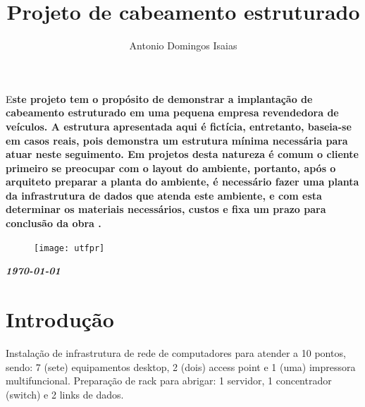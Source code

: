 \documentclass[	DIV=calc,%
							paper=a4,%
							fontsize=12pt,%
							onecolumn]{scrartcl}	 					%
\title{Projeto de cabeamento estruturado}					%
\author{Antonio Domingos Isaias }  	%
\date{}																				%
\newcommand{\initial}[1]{%
     \lettrine[lines=3,lhang=0.3,nindent=0em]{
     				\color{DarkGoldenrod}
     				{\textsf{#1}}}{}}
\begin{document}
\maketitle
\thispagestyle{fancy} 	
\thispagestyle{empty}		%




\initial{E}\textbf{ste projeto tem o propósito de demonstrar a implantação de cabeamento estruturado em uma pequena empresa revendedora de veículos. A estrutura apresentada aqui é fictícia, entretanto, baseia-se em casos reais, pois demonstra um estrutura mínima necessária para atuar neste seguimento.
	Em projetos desta natureza é comum o cliente primeiro se preocupar com o layout do ambiente, portanto, após o arquiteto preparar a planta do ambiente, é necessário fazer uma planta da infrastrutura de dados que atenda este ambiente, e com esta determinar os materiais necessários, custos e fixa um prazo para conclusão da obra  
	.}

\begin{figure}
	\centering
	\texttt{[image: utfpr]}
\end{figure}

\vspace{3cm}
\centerline{\textit{\textbf{\today}}}

\clearpage
    \renewcommand*\listfigurename{Lista de figuras}
\listoffigures

\renewcommand*\listtablename{Lista de tabelas}
\listoftables




\clearpage
\renewcommand{\contentsname}{Sumário}
\tableofcontents
\clearpage

\section{Introdução}
Instalação de infrastrutura de rede de computadores para atender a 10 pontos, sendo: 7 (sete) equipamentos desktop, 2 (dois) access point e 1 (uma) impressora multifuncional.
Preparação de rack para abrigar: 1 servidor, 1 concentrador (switch) e 2 links de dados.
\end{document}
